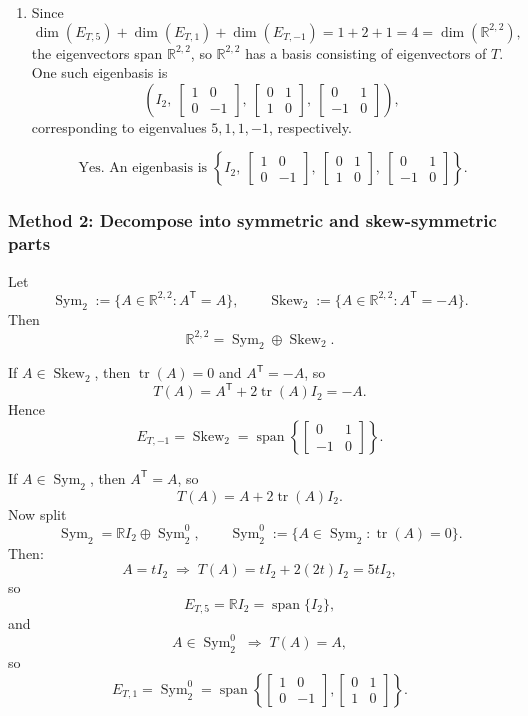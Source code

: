 \documentclass[12pt]{article}
\newcommand{\R}{\mathbb{R}}
\newcommand{\Span}{\operatorname{span}}
\DeclareMathOperator{\tr}{tr}
\DeclareMathOperator{\Sym}{Sym}     %
\DeclareMathOperator{\Skew}{Skew}   %
\begin{document}
\begin{enumerate}[label=(\alph*)]
\item Since
\[
\dim(E_{T,5})+\dim(E_{T,1})+\dim(E_{T,-1})=1+2+1=4=\dim(\R^{2,2}),
\]
the eigenvectors span $\R^{2,2}$, so $\R^{2,2}$ has a basis consisting of eigenvectors of $T$.
One such eigenbasis is
\[
\left(
I_2,\ 
\begin{bmatrix}1&0\\0&-1\end{bmatrix},\
\begin{bmatrix}0&1\\1&0\end{bmatrix},\
\begin{bmatrix}0&1\\-1&0\end{bmatrix}
\right),
\]
corresponding to eigenvalues $5,1,1,-1$, respectively.

\[
\boxed{\,\text{Yes. An eigenbasis is } \left\{I_2,\ \begin{bmatrix}1&0\\0&-1\end{bmatrix},\ \begin{bmatrix}0&1\\1&0\end{bmatrix},\ \begin{bmatrix}0&1\\-1&0\end{bmatrix}\right\}.}
\]
\end{enumerate}

\newpage
\subsubsection{Method 2: Decompose into symmetric and skew-symmetric parts}

Let
\[
\Sym_2:=\{A\in\R^{2,2}:A^{\mathsf T}=A\},\qquad
\Skew_2:=\{A\in\R^{2,2}:A^{\mathsf T}=-A\}.
\]
Then
\[
\R^{2,2}=\Sym_2\oplus\Skew_2.
\]

If $A\in\Skew_2$, then $\tr(A)=0$ and $A^{\mathsf T}=-A$, so
\[
T(A)=A^{\mathsf T}+2\tr(A)I_2=-A.
\]
Hence
\[
E_{T,-1}=\Skew_2
=\Span\!\left\{\begin{bmatrix}0&1\\-1&0\end{bmatrix}\right\}.
\]

If $A\in\Sym_2$, then $A^{\mathsf T}=A$, so
\[
T(A)=A+2\tr(A)I_2.
\]
Now split
\[
\Sym_2=\R I_2\oplus \Sym_2^0,
\qquad
\Sym_2^0:=\{A\in\Sym_2:\tr(A)=0\}.
\]
Then:
\[
A=tI_2 \;\Longrightarrow\; T(A)=tI_2+2(2t)I_2=5tI_2,
\]
so
\[
E_{T,5}=\R I_2=\Span\{I_2\},
\]
and
\[
A\in\Sym_2^0 \;\Longrightarrow\; T(A)=A,
\]
so
\[
E_{T,1}=\Sym_2^0
=
\Span\!\left\{
\begin{bmatrix}1&0\\0&-1\end{bmatrix},
\begin{bmatrix}0&1\\1&0\end{bmatrix}
\right\}.
\]
\end{document}
